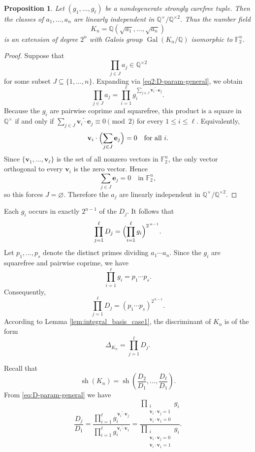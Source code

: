 \documentclass{amsart}
\newcommand{\Q}{\mathbb{Q}}
\newcommand{\F}{\mathbb{F}}
\newcommand{\op}[1]{\operatorname{#1}}
\theoremstyle{plain}
\newtheorem{proposition}[theorem]{Proposition}
\theoremstyle{definition}
\theoremstyle{remark}
\numberwithin{equation}{section}
\begin{document}
\begin{proposition}
Let $(g_1,\dots,g_\ell)$ be a nondegenerate strongly carefree tuple.
Then the classes of $a_1,\dots,a_n$ are linearly independent
in $\Q^\times/\Q^{\times 2}$. Thus the number field 
\[K_n=\Q(\sqrt{a_1}, \dots, \sqrt{a_n})\]
is an extension of degree $2^n$ with Galois group $\op{Gal}(K_n/\Q)$ isomorphic to $\F_2^n$. 
\end{proposition}

\begin{proof}
Suppose that
\[
\prod_{j\in J} a_j \in \Q^{\times 2}
\]
for some subset $J\subseteq\{1,\dots,n\}$.
Expanding via \eqref{eq2:D-param-general}, we obtain
\[
\prod_{j\in J} a_j
=
\prod_{i=1}^\ell
g_i^{\sum_{j\in J} \widetilde{\mathbf v_i\cdot \mathbf e_j}}.
\]
Because the $g_i$ are pairwise coprime and squarefree,
this product is a square in $\Q^\times$ if and only if $\sum_{j\in J} \widetilde{\mathbf v_i\cdot \mathbf e_j}\equiv 0 \pmod 2$ for every $1\le i\le\ell$. Equivalently,
\[
\mathbf v_i\cdot\Bigl(\sum_{j\in J} \mathbf e_j\Bigr)=0
\quad\text{for all }i.
\]
Since $\{\mathbf v_1,\dots,\mathbf v_\ell\}$ is the set of all nonzero vectors
in $\F_2^n$, the only vector orthogonal to every $\mathbf v_i$
is the zero vector.  Hence
\[
\sum_{j\in J} \mathbf e_j=0
\quad\text{in }\F_2^n,
\]
so this forces $J=\varnothing$.  Therefore the $a_j$ are linearly independent in
$\Q^\times/\Q^{\times 2}$.
\end{proof}
Each $g_i$ occurs in exactly $2^{n-1}$ of the $D_j$. It follows that
\[
\prod_{j=1}^{\ell} D_j
=
\Bigl(\prod_{i=1}^{\ell} g_i\Bigr)^{2^{\,n-1}}.
\]
\noindent Let $p_1,\dots,p_s$ denote the distinct primes dividing
$a_1\cdots a_n$.  Since the $g_i$ are squarefree and pairwise
coprime, we have
\[
\prod_{i=1}^{\ell} g_i
=
p_1\cdots p_s.
\]
Consequently,
\[
\prod_{j=1}^{\ell} D_j
=
(p_1\cdots p_s)^{2^{\,n-1}}.
\]
According to Lemma \ref{lem:integral_basis_case1}, the discriminant of $K_n$ is of the form
\[
\Delta_{K_n}
=
\prod_{j=1}^\ell D_j.
\]

Recall that
\[
\operatorname{sh}(K_n)
=
\operatorname{sh}\!\left(
\frac{D_2}{D_1},\dots,\frac{D_\ell}{D_1}
\right).
\]
From \eqref{eq:D-param-general} we have
\[
\frac{D_j}{D_1}
=
\frac{\prod_{i=1}^{\ell}
g_i^{\,\widetilde{\mathbf v_i\cdot\mathbf v_j}}}{\prod_{i=1}^{\ell}
g_i^{\,\widetilde{\mathbf v_i\cdot\mathbf v_1}}}=
\frac{
\prod_{\substack{i\\
\mathbf v_i\cdot \mathbf v_j=1\\
\mathbf v_i\cdot \mathbf v_1=0}}
g_i}
{
\prod_{\substack{i\\
\mathbf v_i\cdot \mathbf v_j=0\\
\mathbf v_i\cdot \mathbf v_1=1}}
g_i}.
\]
\end{document}
